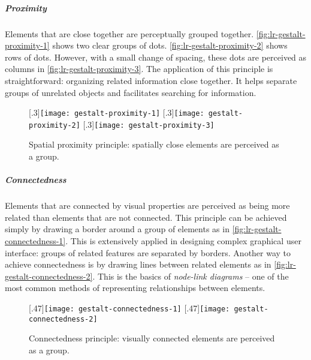 \subparagraph{Proximity}
Elements that are close together are perceptually grouped together. \autoref{fig:lr-gestalt-proximity-1} shows two clear groups of dots. \autoref{fig:lr-gestalt-proximity-2} shows rows of dots. However, with a small change of spacing, these dots are perceived as columns in \autoref{fig:lr-gestalt-proximity-3}. The application of this principle is straightforward: organizing related information close together. It helps separate groups of unrelated objects and facilitates searching for information.

\begin{figure}
	\centering
	[.3\columnwidth]{\texttt{[image: gestalt-proximity-1]}}
	\hfill
	[.3\columnwidth]{\texttt{[image: gestalt-proximity-2]}}
	\hfill
	[.3\columnwidth]{\texttt{[image: gestalt-proximity-3]}}
	\label{fig:lr-gestalt-proximity}
	\caption[Spatial proximity principle]{Spatial proximity principle: spatially close elements are perceived as a group. }
\end{figure}

\subparagraph{Connectedness}
Elements that are connected by visual properties are perceived as being more related than elements that are not connected. This principle can be achieved simply by drawing a border around a group of elements as in \autoref{fig:lr-gestalt-connectedness-1}. This is extensively applied in designing complex graphical user interface: groups of related features are separated by borders. Another way to achieve connectedness is by drawing lines between related elements as in \autoref{fig:lr-gestalt-connectedness-2}. This is the basics of \emph{node-link diagrams} -- one of the most common methods of representing relationships between elements.

\begin{figure}
	\centering
	[.47\columnwidth]{\texttt{[image: gestalt-connectedness-1]}}
	\hfill
	[.47\columnwidth]{\texttt{[image: gestalt-connectedness-2]}}
	\caption[Connectedness principle]{Connectedness principle: visually connected elements are perceived as a group. }
	\label{fig:lr-gestalt-connectedness}
\end{figure}

